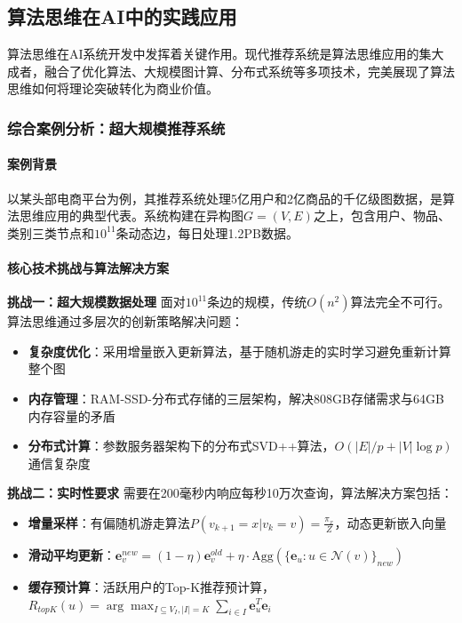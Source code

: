 \subsection{算法思维在AI中的实践应用}

算法思维在AI系统开发中发挥着关键作用。现代推荐系统是算法思维应用的集大成者，融合了优化算法、大规模图计算、分布式系统等多项技术，完美展现了算法思维如何将理论突破转化为商业价值。

\subsubsection{综合案例分析：超大规模推荐系统}

\paragraph{案例背景}
以某头部电商平台为例，其推荐系统处理5亿用户和2亿商品的千亿级图数据，是算法思维应用的典型代表。系统构建在异构图$G = (V, E)$之上，包含用户、物品、类别三类节点和$10^{11}$条动态边，每日处理1.2PB数据。

\paragraph{核心技术挑战与算法解决方案}

\textbf{挑战一：超大规模数据处理}
面对$10^{11}$条边的规模，传统$O(n^2)$算法完全不可行。算法思维通过多层次的创新策略解决问题：

\begin{itemize}
\item \textbf{复杂度优化}：采用增量嵌入更新算法，基于随机游走的实时学习避免重新计算整个图
\item \textbf{内存管理}：RAM-SSD-分布式存储的三层架构，解决808GB存储需求与64GB内存容量的矛盾
\item \textbf{分布式计算}：参数服务器架构下的分布式SVD++算法，$O(|E|/p + |V|\log p)$通信复杂度
\end{itemize}

\textbf{挑战二：实时性要求}
需要在200毫秒内响应每秒10万次查询，算法解决方案包括：

\begin{itemize}
\item \textbf{增量采样}：有偏随机游走算法$P(v_{k+1} = x | v_k = v) = \frac{\pi_{x}}{Z}$，动态更新嵌入向量
\item \textbf{滑动平均更新}：$\mathbf{e}_v^{new} = (1-\eta)\mathbf{e}_v^{old} + \eta \cdot \text{Agg}\left(\{\mathbf{e}_u : u \in \mathcal{N}(v)\}_{new}\right)$
\item \textbf{缓存预计算}：活跃用户的Top-K推荐预计算，$R_{topK}(u) = \arg\max_{I \subseteq V_I, |I|=K} \sum_{i \in I} \mathbf{e}_u^T \mathbf{e}_i$
\end{itemize}


